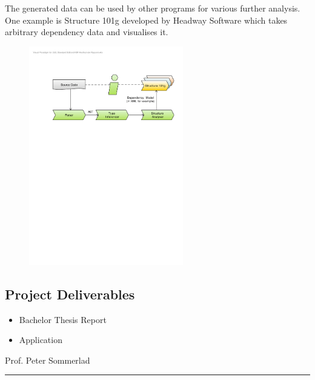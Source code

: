 \documentclass[10pt,halfparskip,DIV15]{scrartcl}
\begin{document}
The generated data can be used by other programs for various further analysis. One example is Structure 101g developed by Headway Software which takes arbitrary dependency data and visualises it. 

\vspace{-0.1cm}

\begin{figure}[h] \centering
\includegraphics[width=0.6\textwidth]{big_picture}
\end{figure}

\vspace{-0.7cm}

\subsection*{Project Deliverables}

\begin{itemize}
	\item Bachelor Thesis Report
	\item Application
\end{itemize}


\vspace{0.5cm}

\hspace{10cm} Prof. Peter Sommerlad

\vspace{0.8cm}

\hspace{10cm} \rule{5cm}{0.4pt}
\end{document}
